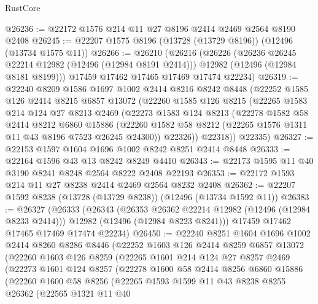 \begin{lexlean}{RustCore}
\begin{coremodule}
@26236 := @22172 @1576 @214 @11 @27 @8196 @2414 @2469 @2564 @8190 @2408
@26245 := @22207 @1575 @8196 (@13728 (@13729 @8196)) (@12496 (@13734 @1575 @11))
@26266 := @26210
    (@26216
      (@26226
        (@26236 @26245 @22214 @12982 (@12496 (@12984 @8191 @2414)))
        @12982
        (@12496 (@12984 @8181 @8199)))
      @17459
      @17462
      @17465
      @17469
      @17474
      @22234)
@26319 := @22240
    @8209
    @1586
    @1697
    @1002
    @2414
    @8216
    @8242
    @8448
    (@22252
      @1585
      @126
      @2414
      @8215
      @6857
      @13072
      (@22260
        @1585
        @126
        @8215
        (@22265
          @1583
          @214
          @124
          @27
          @8213
          @2469
          (@22273
            @1583
            @124
            @8213
            (@22278
              @1582
              @58
              @2414
              @8212
              @6860
              @15886
              (@22260 @1582 @58 @8212 (@22265 @1576 @1311 @11 @43 @8196 @7523 @26245 @24300))
              @22326))
          @22318))
      @22335)
@26327 := @22153 @1597 @1604 @1696 @1002 @8242 @8251 @2414 @8448
@26333 := @22164 @1596 @43 @13 @8242 @8249 @4410
@26343 := @22173 @1595 @11 @40 @3190 @8241 @8248 @2564 @8222 @2408 @22193
@26353 := @22172 @1593 @214 @11 @27 @8238 @2414 @2469 @2564 @8232 @2408
@26362 := @22207 @1592 @8238 (@13728 (@13729 @8238)) (@12496 (@13734 @1592 @11))
@26383 := @26327
    (@26333
      (@26343
        (@26353 @26362 @22214 @12982 (@12496 (@12984 @8233 @2414)))
        @12982
        (@12496 (@12984 @8223 @8241)))
      @17459
      @17462
      @17465
      @17469
      @17474
      @22234)
@26450 := @22240
    @8251
    @1604
    @1696
    @1002
    @2414
    @8260
    @8286
    @8446
    (@22252
      @1603
      @126
      @2414
      @8259
      @6857
      @13072
      (@22260
        @1603
        @126
        @8259
        (@22265
          @1601
          @214
          @124
          @27
          @8257
          @2469
          (@22273
            @1601
            @124
            @8257
            (@22278
              @1600
              @58
              @2414
              @8256
              @6860
              @15886
              (@22260
                @1600
                @58
                @8256
                (@22265
                  @1593
                  @1599
                  @11
                  @43
                  @8238
                  @8255
                  @26362
                  (@22565
                    @1321
                    @11
                    @40

\end{coremodule}
\end{lexlean}
